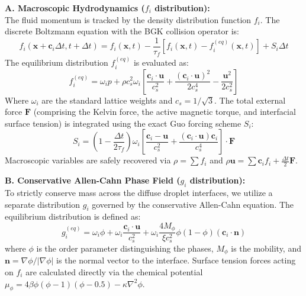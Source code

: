 \documentclass[11pt, a4paper]{article}
\begin{document}
\textbf{A. Macroscopic Hydrodynamics ($f_i$ distribution):}\\
The fluid momentum is tracked by the density distribution function $f_i$. The discrete Boltzmann equation with the BGK collision operator is:
\begin{equation}
    f_i(\mathbf{x} + \mathbf{c}_i \Delta t, t + \Delta t) = f_i(\mathbf{x}, t) - \frac{1}{\tau_f} [f_i(\mathbf{x}, t) - f_i^{(eq)}(\mathbf{x}, t)] + S_i \Delta t
\end{equation}
The equilibrium distribution $f_i^{(eq)}$ is evaluated as:
\begin{equation}
    f_i^{(eq)} = \omega_i p + \rho c_s^2 \omega_i \left[ \frac{\mathbf{c}_i \cdot \mathbf{u}}{c_s^2} + \frac{(\mathbf{c}_i \cdot \mathbf{u})^2}{2c_s^4} - \frac{\mathbf{u}^2}{2c_s^2} \right]
\end{equation}
Where $\omega_i$ are the standard lattice weights and $c_s = 1/\sqrt{3}$. The total external force $\mathbf{F}$ (comprising the Kelvin force, the active magnetic torque, and interfacial surface tension) is integrated using the exact Guo forcing scheme $S_i$:
\begin{equation}
    S_i = \left( 1 - \frac{\Delta t}{2\tau_f} \right) \omega_i \left[ \frac{\mathbf{c}_i - \mathbf{u}}{c_s^2} + \frac{(\mathbf{c}_i \cdot \mathbf{u})\mathbf{c}_i}{c_s^4} \right] \cdot \mathbf{F}
\end{equation}
Macroscopic variables are safely recovered via $\rho = \sum f_i$ and $\rho \mathbf{u} = \sum \mathbf{c}_i f_i + \frac{\Delta t}{2}\mathbf{F}$.

\textbf{B. Conservative Allen-Cahn Phase Field ($g_i$ distribution):}\\
To strictly conserve mass across the diffuse droplet interfaces, we utilize a separate distribution $g_i$ governed by the conservative Allen-Cahn equation. The equilibrium distribution is defined as:
\begin{equation}
    g_i^{(eq)} = \omega_i \phi + \omega_i \frac{\mathbf{c}_i \cdot \mathbf{u}}{c_s^2} + \omega_i \frac{4 M_\phi}{\xi c_s^2} \phi(1-\phi) (\mathbf{c}_i \cdot \mathbf{n})
\end{equation}
where $\phi$ is the order parameter distinguishing the phases, $M_\phi$ is the mobility, and $\mathbf{n} = \nabla\phi / |\nabla\phi|$ is the normal vector to the interface. Surface tension forces acting on $f_i$ are calculated directly via the chemical potential $\mu_\phi = 4\beta\phi(\phi-1)(\phi-0.5) - \kappa\nabla^2\phi$.
\end{document}
